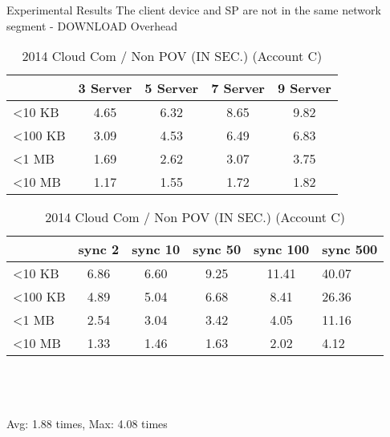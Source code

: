 \begin{frame}{Experimental Results}
{The client device and SP are \alert{not} in the same network segment - DOWNLOAD Overhead}
	\scriptsize
    \begin{table}[]
    \centering
    \caption{My Method / Non POV (IN SEC.) (Account C)}
    \begin{tabular}{lcccc}
                         & 3 Server & 5 Server & 7 Server & 9 Server \\ \hline
        \textless 10 KB  & 4.65 & 6.32 & 8.65 & 9.82 \\ \hline
        \textless 100 KB & 3.09 & 4.53 & 6.49 & 6.83 \\ \hline
        \textless 1 MB   & 1.69 & 2.62 & 3.07 & 3.75 \\ \hline
        \textless 10 MB  & 1.17 & 1.55 & 1.72 & 1.82 \\ \hline
    \end{tabular}
    \caption{2014 Cloud Com / Non POV (IN SEC.) (Account C)}
    \begin{tabular}{lccccl}
                         & sync 2   & sync 10  & sync 50  & sync 100 & sync 500 \\ \hline
        \textless 10 KB  & 6.86 & 6.60 & 9.25 & 11.41  & 40.07  \\ \hline
        \textless 100 KB & 4.89 & 5.04 & 6.68 & 8.41   & 26.36  \\ \hline
        \textless 1 MB   & 2.54 & 3.04 & 3.42 & 4.05   & 11.16  \\ \hline
        \textless 10 MB  & 1.33 & 1.46 & 1.63 & 2.02   & 4.12   \\ \hline
    \end{tabular}
    ~\\
    ~\\
    ~\\
    \alert{Avg: 1.88 times, Max: 4.08 times}
    \end{table}
\end{frame}
